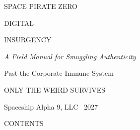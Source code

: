 \begingroup
\thispagestyle{empty}
\centering
\vspace*{\fill}
{\displaysemi\color{cyan}\large SPACE PIRATE ZERO\par}
\vspace{8pt}{\color{pink}\rule{0.9\linewidth}{3pt}}\par
\vspace{26pt}
{\displayfont\color{pink}\fontsize{40}{44}\selectfont DIGITAL\par INSURGENCY\par}
\vspace{20pt}
{\itshape\color{paper}\large A Field Manual for Smuggling Authenticity\par
Past the Corporate Immune System\par}
\vspace{12pt}{\color{cyan}\rule{0.9\linewidth}{1pt}}\par
\vspace*{\fill}
{\ttfamily\color{cyan}\small ONLY THE WEIRD SURVIVES\par}
\vspace{6pt}
{\color{muted}\small Spaceship Alpha 9, LLC \textbullet\ 2027\par}
\endgroup
\clearpage

\begingroup
{\displayfont\color{pink}\LARGE CONTENTS\par}
\vspace{6pt}{\color{cyan}\rule{\linewidth}{1pt}}\par
\vspace{12pt}
\endgroup
\tableofcontents
\clearpage
